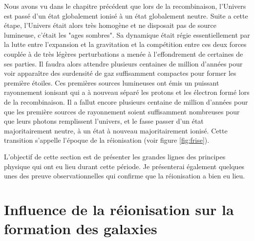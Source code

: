 Nous avons vu dans le chapitre précédent que lors de la recombinaison, l'Univers est passé d'un état globalement ionisé à un état globalement neutre.
Suite a cette étape, l'Univers était alors très homogène et ne disposait pas de source lumineuse, c'était les "ages sombres".
Sa dynamique était régie essentiellement par la lutte entre l'expansion et la gravitation et la compétition entre ces deux forces couplée à de très légères perturbations a menée à l'effondrement de certaines de ses parties.
Il faudra alors attendre plusieurs centaines de million d'années pour voir apparaître des surdensité de gaz suffisamment compactes pour former les première étoiles.
Ces premières sources lumineuses ont émis un puissant rayonnement ionisant qui a à nouveau séparé les protons et les électron formé lors de la recombinaison.
Il a fallut encore plusieurs centaine de million d'années pour que les première sources de rayonnement soient suffisamment nombreuses pour que leurs photons remplissent l'univers, et le fasse passer d'un état majoritairement neutre, à un état à nouveau majoritairement ionisé. 
Cette transition s'appelle l’époque de la réionisation (voir figure \ref{fig:frise}).

L'objectif de cette section est de présenter les grandes lignes des principes physique qui ont eu lieu durant cette période.
Je présenterai également quelques unes des preuve observationnelles qui confirme que la réionisation a bien eu lieu.





\section{Influence de la réionisation sur la formation des galaxies}

